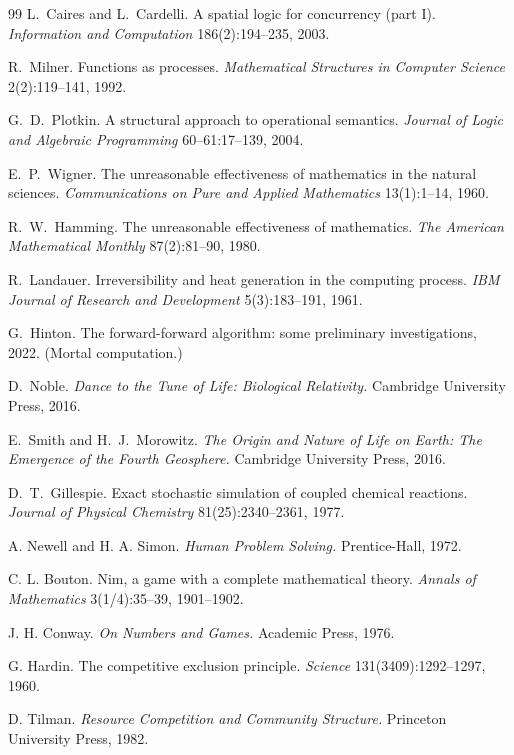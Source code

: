 \begin{thebibliography}{99}
L.\ Caires and L.\ Cardelli. A spatial logic for concurrency (part I). \emph{Information and Computation} 186(2):194--235, 2003.

R.\ Milner. Functions as processes. \emph{Mathematical Structures in Computer Science} 2(2):119--141, 1992.

G.\ D.\ Plotkin. A structural approach to operational semantics. \emph{Journal of Logic and Algebraic Programming} 60--61:17--139, 2004.

E.\ P.\ Wigner. The unreasonable effectiveness of mathematics in the natural sciences. \emph{Communications on Pure and Applied Mathematics} 13(1):1--14, 1960.

R.\ W.\ Hamming. The unreasonable effectiveness of mathematics. \emph{The American Mathematical Monthly} 87(2):81--90, 1980.

R.\ Landauer. Irreversibility and heat generation in the computing process. \emph{IBM Journal of Research and Development} 5(3):183--191, 1961.

G.\ Hinton. The forward-forward algorithm: some preliminary investigations, 2022. (Mortal computation.)

D.\ Noble. \emph{Dance to the Tune of Life: Biological Relativity.} Cambridge University Press, 2016.

E.\ Smith and H.\ J.\ Morowitz. \emph{The Origin and Nature of Life on Earth: The Emergence of the Fourth Geosphere.} Cambridge University Press, 2016.

D.\ T.\ Gillespie. Exact stochastic simulation of coupled chemical reactions. \emph{Journal of Physical Chemistry} 81(25):2340--2361, 1977.

A. Newell and H. A. Simon. \emph{Human Problem Solving.} Prentice-Hall, 1972.

C. L. Bouton. Nim, a game with a complete mathematical theory. \emph{Annals of Mathematics} 3(1/4):35--39, 1901--1902.

J. H. Conway. \emph{On Numbers and Games.} Academic Press, 1976.

G. Hardin. The competitive exclusion principle. \emph{Science} 131(3409):1292--1297, 1960.

D. Tilman. \emph{Resource Competition and Community Structure.} Princeton University Press, 1982.


\end{thebibliography}
